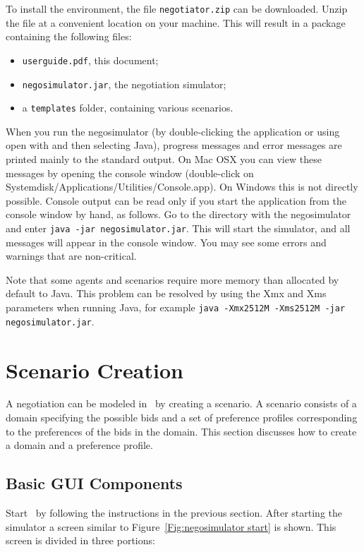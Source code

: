 \documentclass[]{article}
\begin{document}
To install the environment, the file \texttt{negotiator.zip} can be downloaded. Unzip the file at a convenient location on your machine. This will result in a package containing the following files:

\begin{itemize}
	\item \texttt{userguide.pdf}, this document;
	\item \texttt{negosimulator.jar}, the negotiation simulator;
	\item a \texttt{templates} folder, containing various scenarios.
\end{itemize}

When you run the negosimulator (by double-clicking the application or using open with and then selecting Java), progress messages and error messages are printed mainly to the standard output. On Mac OSX you can view these messages by opening the console window (double-click on Systemdisk/Applications/Utilities/Console.app). On Windows this is not directly possible. Console output can be read only if you start the application from the console window by hand, as follows. Go to the directory with the negosimulator and enter
\texttt{java -jar negosimulator.jar}.
This will start the simulator, and all messages will appear in the console window. You may see some errors and warnings that are non-critical.

Note that some agents and scenarios require more memory than allocated by default to Java. This problem can be resolved by using the Xmx and Xms parameters when running Java, for example \texttt{java -Xmx2512M -Xms2512M -jar negosimulator.jar}.

\section{Scenario Creation}
A negotiation can be modeled in \Genius~by creating a scenario. A scenario consists of a domain specifying the possible bids and a set of preference profiles corresponding to the preferences of the bids in the domain. This section discusses how to create a domain and a preference profile.

\subsection{Basic GUI Components}
Start \Genius~by following the instructions in the previous section. After starting the simulator a screen similar to Figure~\ref{Fig:negosimulator start} is shown. This screen is divided in three portions:
\end{document}
